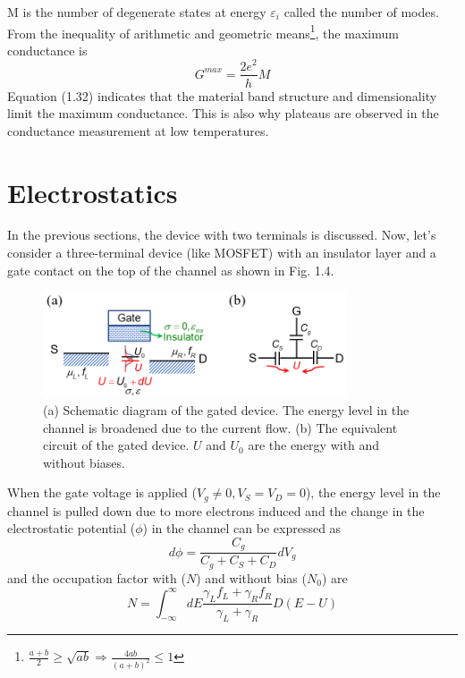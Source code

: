 M is the number of degenerate states at energy $\varepsilon_i$ called the number of modes. From the inequality of arithmetic and geometric means\footnote{$\frac{a+b}{2}\geq\sqrt{ab}\Rightarrow\frac{4ab}{\left(a+b\right)^{2}}\leq1$}, the maximum conductance is \begin{equation}
    G^{max} = \frac{2e^{2}}{h}M
\end{equation} 
Equation (1.32) indicates that the material band structure and dimensionality limit the maximum conductance. This is also why plateaus are observed in the conductance measurement at low temperatures.

\section{Electrostatics}
In the previous sections, the device with two terminals is discussed. Now, let's consider a three-terminal device (like MOSFET) with an insulator layer and a gate contact on the top of the channel as shown in Fig. 1.4.
\begin{figure}[tbp]
\includegraphics[width=0.8\textwidth]{figures/Fig1_4}
\centering
\caption{\small (a) Schematic diagram of the gated device. The energy level in the channel is broadened due to the current flow. (b) The equivalent circuit of the gated device. $U$ and $U_{0}$ are the energy with and without biases.}
\end{figure} When the gate voltage is applied ($V_{g} \neq 0, V_{S} = V_{D} = 0$), the energy level in the channel is pulled down due to more electrons induced and the change in the electrostatic potential ($\phi$) in the channel can be expressed as 
\begin{equation}
    d\phi = \frac{C_{g}}{C_{g}+C_{S}+C_{D}}dV_{g}
\end{equation}
and the occupation factor with ($N$) and without bias ($N_{0}$)  are \begin{equation}
    N = \int_{-\infty}^{\infty} dE \frac{\gamma_{L} f_{L} + \gamma_{R} f_{R}}{\gamma_{L}+\gamma_{R}}D\left(E-U\right)
\end{equation}
